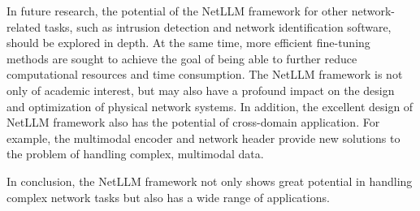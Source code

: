 \documentclass[twocolumn]{article}
\begin{document}
In future research, the potential of the NetLLM framework for other network-related tasks, such as intrusion detection and network identification software, should be explored in depth. At the same time, more efficient fine-tuning methods are sought to achieve the goal of being able to further reduce computational resources and time consumption. The NetLLM framework is not only of academic interest, but may also have a profound impact on the design and optimization of physical network systems. In addition, the excellent design of NetLLM framework also has the potential of cross-domain application. For example, the multimodal encoder and network header provide new solutions to the problem of handling complex, multimodal data.

In conclusion, the NetLLM framework not only shows great potential in handling complex network tasks but also has a wide range of applications.
\end{document}
